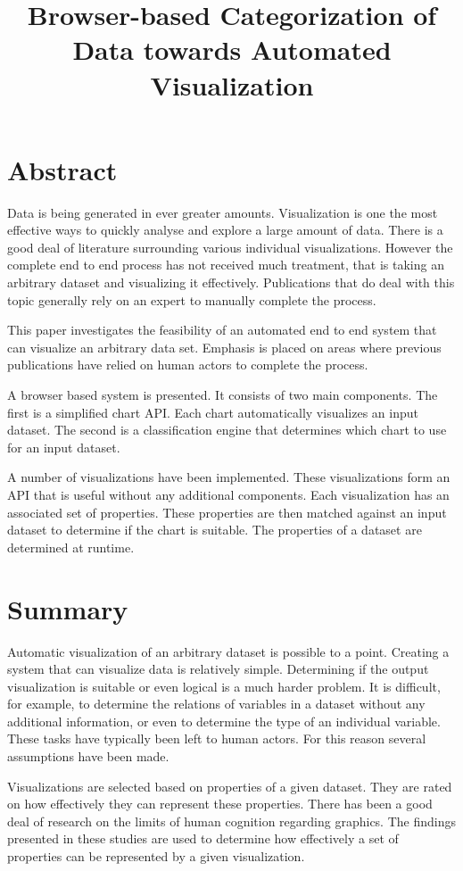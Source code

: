 \documentclass[12pt]{article}
\begin{document}
\title{Browser-based Categorization of Data towards Automated Visualization}

\maketitle





\section*{Abstract}

Data is being generated in ever greater amounts. Visualization is one the most effective ways to quickly analyse and explore a large amount of data. There is a good deal of literature surrounding various individual visualizations. However the complete end to end process has not received much treatment, that is taking an arbitrary dataset and visualizing it effectively. Publications that do deal with this topic generally rely on an expert to manually complete the process.

This paper investigates the feasibility of an automated end to end system that can visualize an arbitrary data set. Emphasis is placed on areas where previous publications have relied on human actors to complete the process.

A browser based system is presented. It consists of two main components. The first is a simplified chart API. Each chart automatically visualizes an input dataset. The second is a classification engine that determines which chart to use for an input dataset.

A number of visualizations have been implemented. These visualizations form an API that is useful without any additional components. Each visualization has an associated set of properties. These properties are then matched against an input dataset to determine if the chart is suitable. The properties of a dataset are determined at runtime. 


\section*{Summary}
Automatic visualization of an arbitrary dataset is possible to a point. Creating a system that can visualize data is relatively simple. Determining if the output visualization is suitable or even logical is a much harder problem. It is difficult, for example, to determine the relations of variables in a dataset without any additional information, or even to determine the type of an individual variable. These tasks have typically been left to human actors. For this reason several assumptions have been made. 

Visualizations are selected based on properties of a given dataset. They are rated on how effectively they can represent these properties. There has been a good deal of research on the limits of human cognition regarding graphics. The findings presented in these studies are used to determine how effectively a set of properties can be represented by a given visualization.
\end{document}
